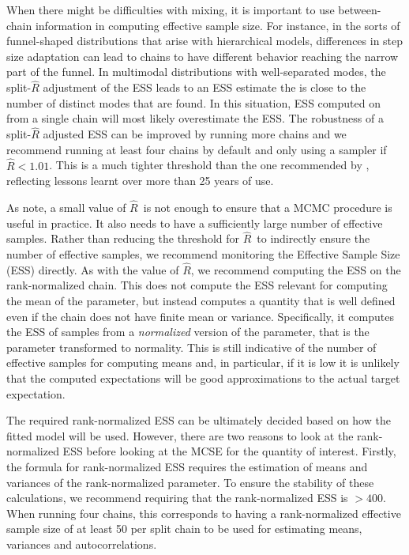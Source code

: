 \documentclass[american,]{article}
\newcommand{\Rhat}{$\widehat{R}$}
\begin{document}
 When there might be difficulties with mixing, it is important to use between-chain 
 information in computing effective sample size. For instance, in the sorts of
  funnel-shaped distributions that arise with hierarchical models, differences 
  in step size adaptation can lead to chains to have
different behavior reaching the narrow part of the funnel. In multimodal 
distributions with well-separated modes, the split-\(\widehat{R}\)
adjustment of the ESS leads to an ESS estimate the is close to the number of
distinct modes that are found. In this situation, ESS computed on from a single
chain will most likely overestimate the ESS.
The robustness of a split-\(\widehat{R}\) adjusted
ESS can be improved by running more chains and we recommend running at
least four chains by default and
 only using a sampler if  $\widehat{R} < 1.01$.  This is a much tighter threshold than 
the one recommended by \citet{Gelman+Rubin:1992}, reflecting lessons learnt
over more than 25 years of use.

As \citet{vats2018revisiting} note, a small value of \Rhat\ is not enough to ensure 
that a MCMC procedure is useful in practice. It also needs to have a sufficiently
large number of effective samples. Rather than reducing the threshold for \Rhat\
to indirectly ensure the number of effective samples, we recommend monitoring
the Effective Sample Size (ESS) directly.  As with the value of \Rhat , we 
recommend computing the ESS on the rank-normalized chain. This does not
compute the ESS relevant for computing the mean of the parameter, but 
instead computes a quantity that is well defined even if the chain does not 
have finite mean or variance.  Specifically, it computes the ESS of samples 
from a \emph{normalized} version of the parameter, that is the parameter 
transformed to normality. This is still indicative of the number of effective 
samples for computing means and, in particular, if it is low it is unlikely that
the computed expectations will be good approximations to the actual
target expectation.  

The required  rank-normalized ESS can be ultimately decided based on how
 the fitted model will be used. However, there are two reasons to look at
the rank-normalized ESS before looking at the MCSE for the quantity of interest.
 Firstly, the formula for rank-normalized ESS requires the estimation of means
 and variances of the rank-normalized parameter. To ensure the stability of 
 these calculations, we recommend requiring that the rank-normalized ESS is 
 $>400$. When running four chains, this corresponds to having
a rank-normalized effective sample size of at least 50 per split chain to be used
for estimating means, variances and autocorrelations. 
\end{document}

